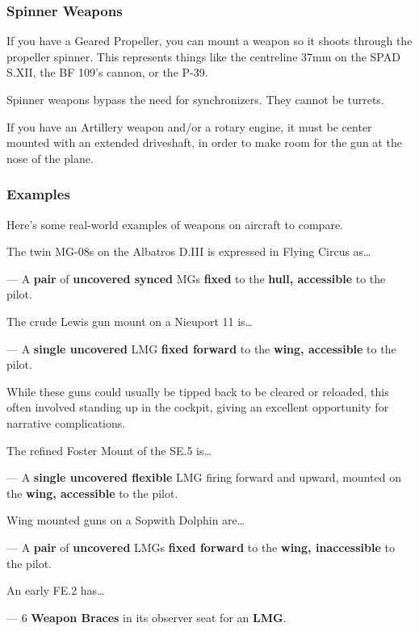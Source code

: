 \documentclass{article}
\begin{document}
\subsubsection{Spinner Weapons}
\label{_Spinner_Weapons}

If you have a Geared Propeller, you can mount a weapon so it shoots
through the propeller spinner. This represents things like the
centreline 37mm on the SPAD S.XII, the BF 109's cannon, or the P-39.

Spinner weapons bypass the need for synchronizers. They cannot be
turrets.

If you have an Artillery weapon and/or a rotary engine, it must be
center mounted with an extended driveshaft, in order to make room for
the gun at the nose of the plane.

\subsubsection{Examples}
\label{_Examples}

Here's some real-world examples of weapons on aircraft to compare.

The twin MG-08s on the Albatros D.III is expressed in Flying Circus
as\ldots{}

--- A \textbf{pair} of \textbf{uncovered
    synced} MGs \textbf{fixed} to the
\textbf{hull, accessible }to
the pilot.

The crude Lewis gun mount on a Nieuport 11 is\ldots{}

--- A \textbf{single uncovered} LMG \textbf{fixed forward} to the \textbf{wing, accessible} to
the pilot.

While these guns could usually be tipped back to be cleared or
reloaded, this often involved standing up in the cockpit, giving an
excellent opportunity for narrative complications.

The refined Foster Mount of the SE.5 is\ldots{}

--- A \textbf{single uncovered flexible} LMG firing forward and upward, mounted on the
\textbf{wing, accessible} to
the pilot.

Wing mounted guns on a Sopwith Dolphin are\ldots{}

--- A \textbf{pair }of
\textbf{uncovered} LMGs \textbf{fixed forward} to the \textbf{wing, inaccessible} to the pilot.

An early FE.2 has\ldots{}

--- 6 \textbf{Weapon Braces }in its observer seat for
an \textbf{LMG}.
\end{document}
